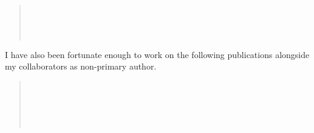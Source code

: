\begin{leftbar}
\begin{quote}%
  \citep{tracy2020}  \\[5mm]
  \citep{tracy2021}  \\[5mm]
  \citep{tracy2022f}  \\[5mm]
  \citep{tracy2022}  
\end{quote}
\end{leftbar}

\vspace{7mm}
\noindent
I have also been fortunate enough to work on the following publications alongside my collaborators as non-primary author.

\begin{leftbar}
\begin{quote}%
   \\[5mm]
   \\[5mm]
   \\[5mm]
   \\[5mm]
\end{quote}
\end{leftbar}



